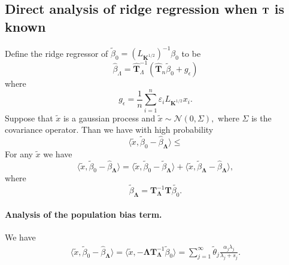 \documentclass[11pt,a4paper]{article}
\newcommand{\bLambda}{{\boldsymbol \Lambda}}
\renewcommand{\hat}{\widehat}
\renewcommand{\tilde}{\widetilde}
\theoremstyle{definition}
\theoremstyle{plain}
\theoremstyle{remark}
\begin{document}
%

\subsection{Direct analysis of ridge regression when $\bold{T}$ is known}

Define the ridge regressor of $\tilde{\beta}_0 = (L_{\boldsymbol{K}^{1/2}})^{-1}\beta_0$ to be
\[\hat{\beta}_\Lambda = \hat{\boldsymbol{T}}_\Lambda^{-1}(\hat{\boldsymbol T}_n\tilde{\beta}_0+g_\epsilon)\]
where 
\[g_\epsilon = \frac{1}{n}\sum_{i=1}^n \varepsilon_iL_{\boldsymbol K^{1/2}}x_i.\]
Suppose that $\tilde{x}$ is a gaussian process and $\tilde{x}\sim \mathcal{N}(0,\Sigma),$ where $\Sigma$ is the covariance operator. Than we have with high probability
\[\langle \tilde x, \tilde\beta_0-\hat{\beta}_\bLambda \rangle\leq \]
For any $\tilde x$ we have
\[\langle \tilde x, \tilde\beta_0-\hat{\beta}_\bLambda \rangle=\langle \tilde x, \tilde{\beta}_0-\tilde{\beta}_\bLambda \rangle+\langle \tilde x, \tilde{\beta}_\bLambda-\hat{\beta}_\bLambda\rangle,\]
where
\[\tilde{\beta}_\bLambda=\boldsymbol{T}_{\bLambda}^{-1}\boldsymbol{T}\tilde{\beta_0}.\]

\paragraph{Analysis of the population bias term.}
We have
\begin{align*}
	\langle \tilde x, \tilde\beta_0-\hat{\beta}_\bLambda \rangle = \langle \tilde x,-\bLambda  {\boldsymbol T}_{\bLambda}^{-1}\tilde\beta_0\rangle=\sum_{j=1}^{\infty} \tilde{\theta}_j\frac{\alpha_j\lambda_j}{\lambda_j+s_j}.
\end{align*}
\end{document}
